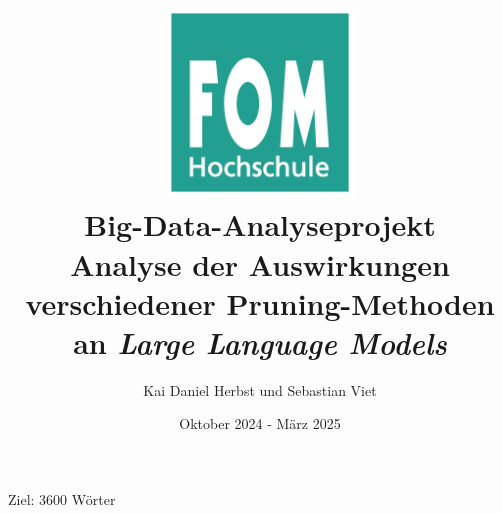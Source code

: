 \documentclass[12pt]{article}
\title{
    \includegraphics[width=5cm]{images/logo.png}
    \\
    \vspace{1cm}
    \textbf{Big-Data-Analyseprojekt}\\ \bigskip \large Analyse der Auswirkungen
    verschiedener Pruning-Methoden an \emph{Large Language Models}
}
\author{Kai Daniel Herbst und Sebastian Viet}
\date{Oktober 2024 - März 2025}
\begin{document}
\begin{sloppypar}
	\maketitle
	\thispagestyle{empty}

	\newpage
	\setcounter{page}{1}

	\renewcommand{\contentsname}{Inhaltsverzeichnis}
	\tableofcontents

	\newpage
	\setcounter{page}{1}

	Ziel: 3600 Wörter

	
	
	
	
	

\end{sloppypar}
\end{document}
